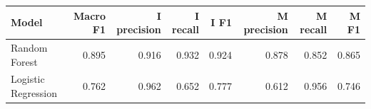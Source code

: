 \begin{tabular}{lrrrrrrr}
\toprule
Model & Macro F1 & I precision & I recall & I F1 & M precision & M recall & M F1 \\
\midrule
Random Forest & 0.895 & 0.916 & 0.932 & 0.924 & 0.878 & 0.852 & 0.865 \\
Logistic Regression & 0.762 & 0.962 & 0.652 & 0.777 & 0.612 & 0.956 & 0.746 \\
\bottomrule
\end{tabular}
